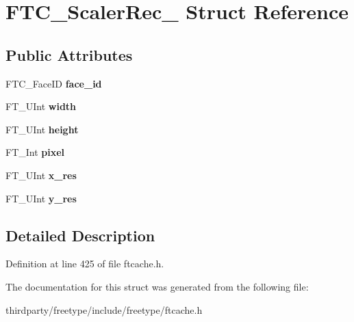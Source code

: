 \hypertarget{struct_f_t_c___scaler_rec__}{}\section{F\+T\+C\+\_\+\+Scaler\+Rec\+\_\+ Struct Reference}
\label{struct_f_t_c___scaler_rec__}
\subsection*{Public Attributes}
\begin{DoxyCompactItemize}
\item 
\mbox{\label{struct_f_t_c___scaler_rec___a8e963aa619409e646558fe7aa272e81f}} 
F\+T\+C\+\_\+\+Face\+ID {\bfseries face\+\_\+id}
\item 
\mbox{\label{struct_f_t_c___scaler_rec___a11e13d907ca4661bf7c1d98fffecf321}} 
F\+T\+\_\+\+U\+Int {\bfseries width}
\item 
\mbox{\label{struct_f_t_c___scaler_rec___a9b3a9b4d7148bbaa4daaae1e1fbb2dbc}} 
F\+T\+\_\+\+U\+Int {\bfseries height}
\item 
\mbox{\label{struct_f_t_c___scaler_rec___ab78868341e2d66f17e6f1d77e9e054d2}} 
F\+T\+\_\+\+Int {\bfseries pixel}
\item 
\mbox{\label{struct_f_t_c___scaler_rec___a886c7c1230dc5d5e6b3fc32d06274752}} 
F\+T\+\_\+\+U\+Int {\bfseries x\+\_\+res}
\item 
\mbox{\label{struct_f_t_c___scaler_rec___accb53c7a9aeebb41c05f48d14d3dfe71}} 
F\+T\+\_\+\+U\+Int {\bfseries y\+\_\+res}
\end{DoxyCompactItemize}


\subsection{Detailed Description}


Definition at line 425 of file ftcache.\+h.



The documentation for this struct was generated from the following file\+:\begin{DoxyCompactItemize}
\item 
thirdparty/freetype/include/freetype/ftcache.\+h\end{DoxyCompactItemize}
